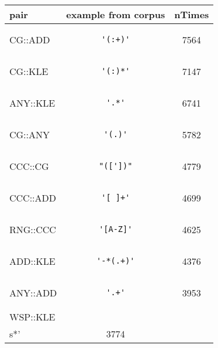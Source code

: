 \begin{center}
\begin{tabular}{lcc}
\toprule
pair & example from corpus & nTimes \\ 
\midrule
CG::ADD & \begin{minipage}{2in}
\begin{verbatim}
'(:+)'\end{verbatim}
\end{minipage}
& 7564 \\ 
\midrule
CG::KLE & \begin{minipage}{2in}
\begin{verbatim}
'(:)*'\end{verbatim}
\end{minipage}
& 7147 \\ 
\midrule
ANY::KLE & \begin{minipage}{2in}
\begin{verbatim}
'.*'\end{verbatim}
\end{minipage}
& 6741 \\ 
\midrule
CG::ANY & \begin{minipage}{2in}
\begin{verbatim}
'(.)'\end{verbatim}
\end{minipage}
& 5782 \\ 
\midrule
CCC::CG & \begin{minipage}{2in}
\begin{verbatim}
"(['])"\end{verbatim}
\end{minipage}
& 4779 \\ 
\midrule
CCC::ADD & \begin{minipage}{2in}
\begin{verbatim}
'[ ]+'\end{verbatim}
\end{minipage}
& 4699 \\ 
\midrule
RNG::CCC & \begin{minipage}{2in}
\begin{verbatim}
'[A-Z]'\end{verbatim}
\end{minipage}
& 4625 \\ 
\midrule
ADD::KLE & \begin{minipage}{2in}
\begin{verbatim}
'-*(.+)'\end{verbatim}
\end{minipage}
& 4376 \\ 
\midrule
ANY::ADD & \begin{minipage}{2in}
\begin{verbatim}
'.+'\end{verbatim}
\end{minipage}
& 3953 \\ 
\midrule
WSP::KLE & \begin{minipage}{2in}
\begin{verbatim}
'\\s*'\end{verbatim}
\end{minipage}
& 3774 \\ 
\bottomrule
\end{tabular}
\end{center}
